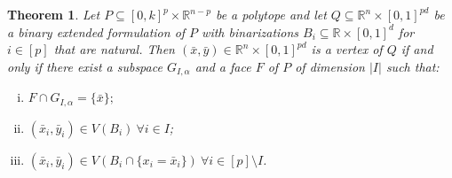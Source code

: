 \documentclass[11pt,a4paper]{article}
\newtheorem{theorem}{Theorem}[section]
\newcommand{\R}{\mathbb{R}}
\newcommand{\1}{\textbf{1}}
\begin{document}
\begin{theorem}\label{thm:verticesQ}
 Let $P\subseteq [0,k]^p\times \R^{n-p}$ be a polytope and let $Q\subseteq\R^n\times [0,1]^{pd}$ be a binary extended formulation of $P$ with binarizations $B_i\subseteq \R\times [0,1]^d$ for $i\in [p]$ that are natural. %
Then $(\bar{x},\bar{y}) \in \R^n\times [0,1]^{pd}$ is a vertex of $Q$ if and only if there exist a subspace $G_{I,\alpha}$ and a face $F$ of $P$ of dimension $|I|$ such that:
\begin{enumerate}[i)]
\item $F\cap G_{I,\alpha}=\{\bar{x}\};$
\item $(\bar{x}_i,\bar{y}_i)\in V(B_i)\:\forall i\in I$;
\item $(\bar{x}_i,\bar{y}_i)\in V(B_i\cap\{x_i=\bar{x}_i\}) \:\forall i\in [p]\setminus I$.
\end{enumerate}
\end{theorem}
\end{document}
